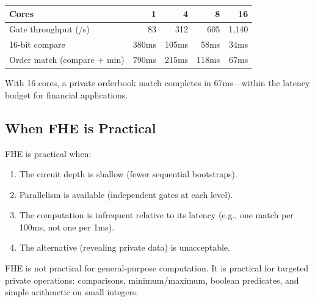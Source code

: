 \begin{center}
\begin{tabular}{lrrrr}
\toprule
\textbf{Cores} & \textbf{1} & \textbf{4} & \textbf{8} & \textbf{16} \\
\midrule
Gate throughput (/s) & 83 & 312 & 605 & 1,140 \\
16-bit compare & 380ms & 105ms & 58ms & 34ms \\
Order match (compare + min) & 790ms & 215ms & 118ms & 67ms \\
\bottomrule
\end{tabular}
\end{center}

With 16 cores, a private orderbook match completes in 67ms---within the latency budget for financial applications.

\subsection{When FHE is Practical}

FHE is practical when:
\begin{enumerate}[leftmargin=2em]
\item The circuit depth is shallow (fewer sequential bootstraps).
\item Parallelism is available (independent gates at each level).
\item The computation is infrequent relative to its latency (e.g., one match per 100ms, not one per 1ms).
\item The alternative (revealing private data) is unacceptable.
\end{enumerate}

FHE is not practical for general-purpose computation. It is practical for targeted private operations: comparisons, minimum/maximum, boolean predicates, and simple arithmetic on small integers.

